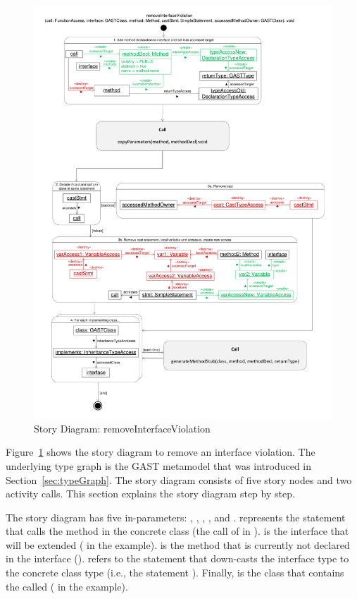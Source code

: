 \begin{figure}[hbtp]
\centering
\includegraphics[width=\linewidth]{./figures/SDRemoveInterfaceViolation}
\caption{Story Diagram: removeInterfaceViolation}
\label{fig:SDRemoveInterfaceViolation}
\end{figure}

Figure~\ref{fig:SDRemoveInterfaceViolation} shows the story diagram to remove an interface violation. The underlying type graph is the GAST metamodel that was introduced in Section~\ref{sec:typeGraph}. The story diagram consists of five story nodes and two activity calls. This section explains the story diagram step by step.

The story diagram has five in-parameters: , , , , and .  represents the statement that calls the method in the concrete class (the call of  in ).  is the interface that will be extended ( in the example).  is the method that is currently not declared in the interface ().  refers to the statement that down-casts the interface type to the concrete class type (i.e., the statement ). Finally,  is the class that contains the called  ( in the example).

